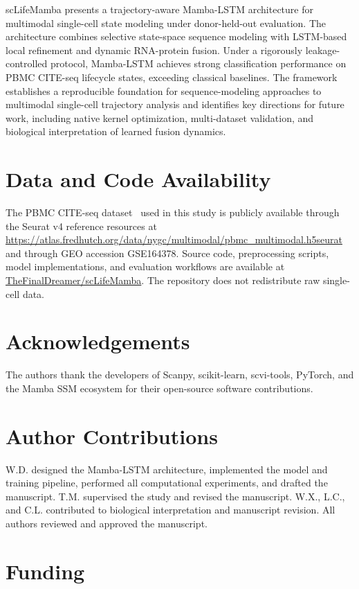 \documentclass[11pt,twocolumn]{article}
\begin{document}
scLifeMamba presents a trajectory-aware Mamba-LSTM architecture for multimodal single-cell state modeling under donor-held-out evaluation. The architecture combines selective state-space sequence modeling with LSTM-based local refinement and dynamic RNA-protein fusion. Under a rigorously leakage-controlled protocol, Mamba-LSTM achieves strong classification performance on PBMC CITE-seq lifecycle states, exceeding classical baselines. The framework establishes a reproducible foundation for sequence-modeling approaches to multimodal single-cell trajectory analysis and identifies key directions for future work, including native kernel optimization, multi-dataset validation, and biological interpretation of learned fusion dynamics.

\section*{Data and Code Availability}

The PBMC CITE-seq dataset~\citep{hao2021} used in this study is publicly available through the Seurat v4 reference resources at \url{https://atlas.fredhutch.org/data/nygc/multimodal/pbmc_multimodal.h5seurat} and through GEO accession GSE164378. Source code, preprocessing scripts, model implementations, and evaluation workflows are available at \href{https://github.com/TheFinalDreamer/scLifeMamba}{TheFinalDreamer/scLifeMamba}. The repository does not redistribute raw single-cell data.

\section*{Acknowledgements}

The authors thank the developers of Scanpy, scikit-learn, scvi-tools, PyTorch, and the Mamba SSM ecosystem for their open-source software contributions.

\section*{Author Contributions}

W.D. designed the Mamba-LSTM architecture, implemented the model and training pipeline, performed all computational experiments, and drafted the manuscript. T.M. supervised the study and revised the manuscript. W.X., L.C., and C.L. contributed to biological interpretation and manuscript revision. All authors reviewed and approved the manuscript.

\section*{Funding}
\end{document}

